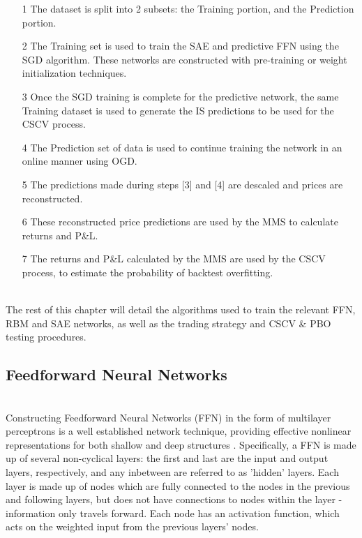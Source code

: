 \documentclass[a4paper,11pt,oneside]{article}
\theoremstyle{plain}
\theoremstyle{definition}
\begin{document}
	\begin{itemize}
		\item [1] The dataset is split into 2 subsets: the Training portion, and the Prediction portion.
		\item [2] The Training set is used to train the SAE and predictive FFN using the SGD algorithm. These networks are constructed with pre-training or weight initialization techniques.
		\item [3] Once the SGD training is complete for the predictive network, the same Training dataset is used to generate the IS predictions to be used for the CSCV process.
		\item [4] The Prediction set of data is used to continue training the network in an online manner using OGD.
		\item [5] The predictions made during steps [3] and [4] are descaled and prices are reconstructed.
		\item [6] These reconstructed price predictions are used by the MMS to calculate returns and P\&L.
		\item [7] The returns and P\&L calculated by the MMS are used by the CSCV process, to estimate the probability of backtest overfitting.
	\end{itemize}
	~\\
	The rest of this chapter will detail the algorithms used to train the relevant FFN, RBM and SAE networks, as well as the trading strategy and CSCV \& PBO testing procedures.
	
	\subsection{Feedforward Neural Networks}\label{imp_ffn}
	~\\
	Constructing Feedforward Neural Networks (FFN) in the form of multilayer perceptrons is a well established network technique, providing effective nonlinear representations for both shallow and deep structures \cite{Schmidhuber}. Specifically, a FFN is made up of several non-cyclical layers: the first and last are the input and output layers, respectively, and any inbetween are referred to as 'hidden' layers. Each layer is made up of nodes which are fully connected to the nodes in the previous and following layers, but does not have connections to nodes within the layer - information only travels forward. Each 
	node has an activation function, which acts on the weighted input from the previous layers' nodes.
	
\end{document}
